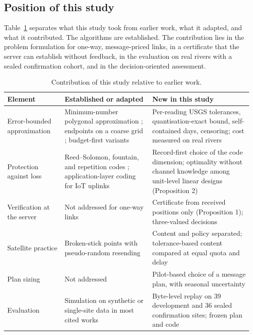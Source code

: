 \subsection{Position of this study}
Table~\ref{tab:novelty} separates what this study took from earlier work, what it adapted, and what it contributed. The algorithms are established. The contribution lies in the problem formulation for one-way, message-priced links, in a certificate that the server can establish without feedback, in the evaluation on real rivers with a sealed confirmation cohort, and in the decision-oriented assessment.

\begin{table}[t]
\centering
\caption{Contribution of this study relative to earlier work.}
\label{tab:novelty}
\small
\begin{tabularx}{\textwidth}{@{}lXX@{}}
\toprule
Element & Established or adapted & New in this study \\
\midrule
Error-bounded approximation & Minimum-number polygonal approximation \citep{imai1988,orourke1981}; endpoints on a coarse grid \citep{lin2019,lin2025}; budget-first variants \citep{deligiannakis2007} & Per-reading USGS tolerances, quantisation-exact bound, self-contained days, censoring; cost measured on real rivers \\
Protection against loss & Reed--Solomon, fountain, and repetition codes \citep{reed1960,luby2002,ho2006}; application-layer coding for IoT uplinks \citep{chaubey2022} & Record-first choice of the code dimension; optimality without channel knowledge among unit-level linear designs (Proposition 2) \\
Verification at the server & Not addressed for one-way links & Certificate from received positions only (Proposition 1); three-valued decisions \\
Satellite practice & Broken-stick points with pseudo-random resending \citep{boehme2009,photopoulou2015} & Content and policy separated; tolerance-based content compared at equal quota and delay \\
Plan sizing & Not addressed & Pilot-based choice of a message plan, with seasonal uncertainty \\
Evaluation & Simulation on synthetic or single-site data in most cited works & Byte-level replay on 39 development and 36 sealed confirmation sites; frozen plan and code \\
\bottomrule
\end{tabularx}
\end{table}
